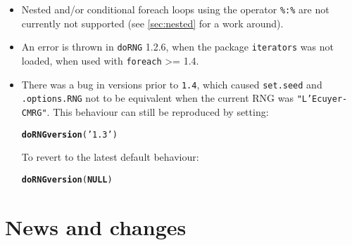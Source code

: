 \documentclass[a4paper,12pt]{article}\usepackage[]{graphicx}\usepackage[]{color}
\makeatletter
\newcommand{\hlstr}[1]{\textcolor[rgb]{0.192,0.494,0.8}{#1}}%
\newcommand{\hlstd}[1]{\textcolor[rgb]{0.345,0.345,0.345}{#1}}%
\newcommand{\hlkwa}[1]{\textcolor[rgb]{0.161,0.373,0.58}{\textbf{#1}}}%
\newcommand{\hlkwd}[1]{\textcolor[rgb]{0.737,0.353,0.396}{\textbf{#1}}}%
\newenvironment{kframe}{%
 \def\at@end@of@kframe{}%
 \ifinner\ifhmode%
  \def\at@end@of@kframe{\end{minipage}}%
  \begin{minipage}{\columnwidth}%
 \fi\fi%
 \def\FrameCommand##1{\hskip\@totalleftmargin \hskip-\fboxsep
 \colorbox{shadecolor}{##1}\hskip-\fboxsep
     \hskip-\linewidth \hskip-\@totalleftmargin \hskip\columnwidth}%
 \MakeFramed {\advance\hsize-\width
   \@totalleftmargin\z@ \linewidth\hsize
   \@setminipage}}%
 {\par\unskip\endMakeFramed%
 \at@end@of@kframe}
\newenvironment{knitrout}{}{} %
\let\code=\texttt
\makeatother
\begin{document}
\begin{itemize}
\item Nested and/or conditional foreach loops using the operator \code{\%:\%} are not 
currently not supported (see \cref{sec:nested} for a work around).
\item An error is thrown in \code{doRNG} 1.2.6, when the package \code{iterators} was not loaded, when used with 
\code{foreach} >= 1.4.
\item There was a bug in versions prior to \code{1.4}, which caused \code{set.seed} and 
\code{.options.RNG} not to be equivalent when the current RNG was \code{"L'Ecuyer-CMRG"}.
This behaviour can still be reproduced by setting:
\begin{knitrout}\footnotesize
{}\color{fgcolor}\begin{kframe}
\begin{alltt}
\hlkwd{doRNGversion}\hlstd{(}\hlstr{'1.3'}\hlstd{)}
\end{alltt}
\end{kframe}
\end{knitrout}
To revert to the latest default behaviour:
\begin{knitrout}\footnotesize
{}\color{fgcolor}\begin{kframe}
\begin{alltt}
\hlkwd{doRNGversion}\hlstd{(}\hlkwa{NULL}\hlstd{)}
\end{alltt}
\end{kframe}
\end{knitrout}
\end{itemize} 

\section{News and changes}
\end{document}
